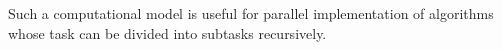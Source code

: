 Such a computational model is useful for parallel implementation of
algorithms whose task can be divided into subtasks recursively.  

%
%

